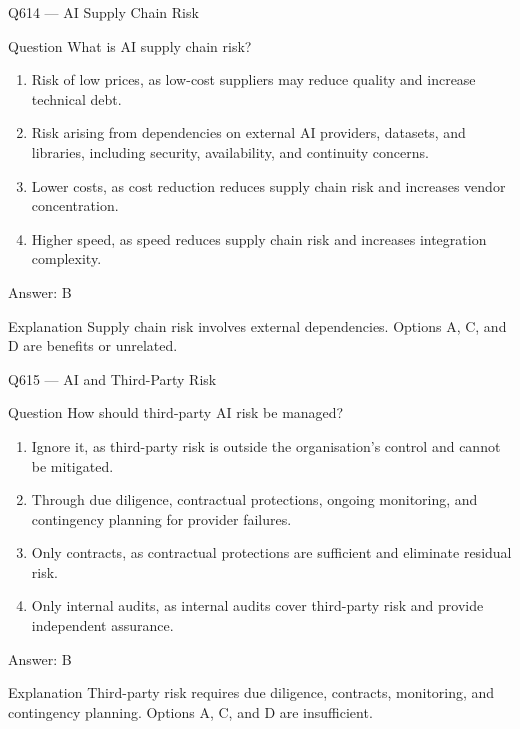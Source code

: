 \documentclass[aspectratio=169,8pt]{beamer}
\begin{document}
	\begin{frame}{Q614 --- AI Supply Chain Risk}
		\begin{block}{Question}
			What is AI supply chain risk?
			\begin{enumerate}
				\item Risk of low prices, as low-cost suppliers may reduce quality and increase technical debt.
				\item Risk arising from dependencies on external AI providers, datasets, and libraries, including security, availability, and continuity concerns.
				\item Lower costs, as cost reduction reduces supply chain risk and increases vendor concentration.
				\item Higher speed, as speed reduces supply chain risk and increases integration complexity.
			\end{enumerate}
		\end{block}
		\begin{exampleblock}{Answer: B}\end{exampleblock}
		\begin{block}{Explanation}
			Supply chain risk involves external dependencies. Options A, C, and D are benefits or unrelated.
		\end{block}
	\end{frame}
	
	\begin{frame}{Q615 --- AI and Third-Party Risk}
		\begin{block}{Question}
			How should third-party AI risk be managed?
			\begin{enumerate}
				\item Ignore it, as third-party risk is outside the organisation's control and cannot be mitigated.
				\item Through due diligence, contractual protections, ongoing monitoring, and contingency planning for provider failures.
				\item Only contracts, as contractual protections are sufficient and eliminate residual risk.
				\item Only internal audits, as internal audits cover third-party risk and provide independent assurance.
			\end{enumerate}
		\end{block}
		\begin{exampleblock}{Answer: B}\end{exampleblock}
		\begin{block}{Explanation}
			Third-party risk requires due diligence, contracts, monitoring, and contingency planning. Options A, C, and D are insufficient.
		\end{block}
	\end{frame}
	
\end{document}
